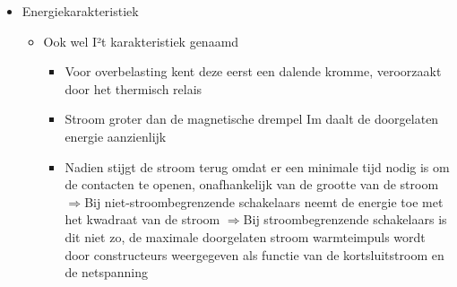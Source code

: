 \documentclass[12pt]{article}
\begin{document}
\begin{itemize}
\begin{itemize}
    \end{itemize}
    \item Energiekarakteristiek\begin{itemize}
        \item Ook wel I²t karakteristiek genaamd\begin{itemize}
            \item Voor overbelasting kent deze eerst een dalende kromme, veroorzaakt door het thermisch relais
            \item Stroom groter dan de magnetische drempel Im daalt de doorgelaten energie aanzienlijk
            \item Nadien stijgt de stroom terug omdat er een minimale tijd nodig is om de contacten te openen, onafhankelijk van de grootte van de stroom
            $\Rightarrow$Bij niet-stroombegrenzende schakelaars neemt de energie toe met het kwadraat van de stroom
            $\Rightarrow$Bij stroombegrenzende schakelaars is dit niet zo, de maximale doorgelaten stroom warmteimpuls wordt door constructeurs weergegeven als functie van de kortsluitstroom en de netspanning
        \end{itemize}
    \end{itemize}
\end{itemize}
\end{document}
